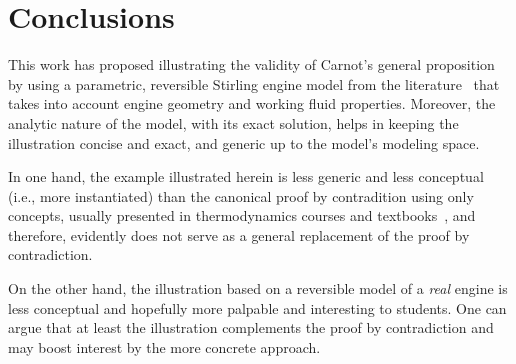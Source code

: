 \section{Conclusions}

    This   work   has   proposed    illustrating    the    validity    of    Carnot's    general
    proposition~\cite{1897-ThurstonRH-Wiley} by using a parametric, reversible  Stirling  engine
    model from the literature~\cite{2012-ChengCH+YangHS-ApEnergy} that takes into account engine
    geometry and working fluid properties. Moreover, the analytic nature of the model, with  its
    exact solution, helps in keeping the illustration concise and exact, and generic up  to  the
    model's modeling space.

    In one hand, the example illustrated herein is less generic and less conceptual (i.e.,  more
    instantiated) than  the  canonical  proof  by  contradition  using  only  concepts,  usually
    presented  in   thermodynamics   courses   and   textbooks~\cite{2013-CengelYA+BolesMA-AMGH,
    2002-MoranMJ+ShapiroHN-LTC, 1986-JonesJB+HawkinsGA-Wiley}, and therefore, evidently does not
    serve as a general replacement of the proof by contradiction.

    On the other hand, the illustration based on a reversible model of a \emph{real}  engine  is
    less conceptual and hopefully more palpable and interesting to students. One can argue  that
    at least the illustration complements the proof by contradiction and may boost  interest  by
    the more concrete approach.


